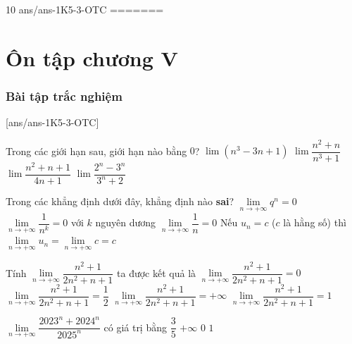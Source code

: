 \begin{indapan}{10}
	{ans/ans-1K5-3-OTC}
=======
\section{Ôn tập chương V}
\subsubsection{Bài tập trắc nghiệm}
[ans/ans-1K5-3-OTC]
\begin{ex}%
	Trong các giới hạn sau, giới hạn nào bằng $ 0 $?
	\choice
	{$ \lim(n^3-3n+1) $}
	{\True $ \lim\dfrac{n^2+n}{n^3+1} $}
	{$ \lim\dfrac{n^2+n+1}{4n+1} $}
	{$ \lim\dfrac{2^n-3^n}{3^n+2} $}
\end{ex}
\begin{ex}%
	Trong các khẳng định dưới đây, khẳng định nào \textbf{sai}?
	\choice
	{\True $\lim\limits_{n \to +\infty} q^n=0$}
	{$\lim\limits_{n \to +\infty} \dfrac{1}{n^k}=0$ với $k$ nguyên dương}
	{$\lim\limits_{n \to +\infty} \dfrac{1}{n}=0$}
	{Nếu $u_n=c$ ($c$ là hằng số) thì $\lim\limits_{n \to +\infty} u_n=\lim \limits_{n \to +\infty}c=c$}
\end{ex}

\begin{ex}%
	Tính $\lim \limits_{n \to +\infty}\dfrac{n^2+1}{2n^2+n+1}$ ta được kết quả là
	\choice
	{$\lim \limits_{n \to +\infty}\dfrac{n^2+1}{2n^2+n+1}=0$}
	{\True $\lim \limits_{n \to +\infty}\dfrac{n^2+1}{2n^2+n+1}=\dfrac{1}{2}$}
	{$\lim \limits_{n \to +\infty}\dfrac{n^2+1}{2n^2+n+1}=+\infty $}
	{$\lim \limits_{n \to +\infty}\dfrac{n^2+1}{2n^2+n+1}=1$}
\end{ex}

\begin{ex}%
	$\lim \limits_{n \to +\infty}\dfrac{2023^n+2024^n}{2025^n}$ có giá trị bằng
	\choice
	{$\dfrac{3}{5}$}
	{$+\infty$}
	{\True $0$}
	{$1$}
\end{ex}


\end{indapan}

